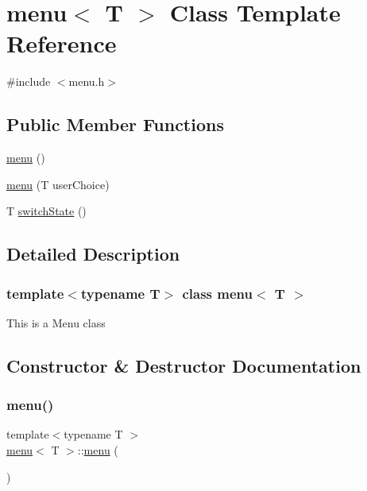 \hypertarget{classmenu}{}\section{menu$<$ T $>$ Class Template Reference}
\label{classmenu}


{\ttfamily \#include $<$menu.\+h$>$}

\subsection*{Public Member Functions}
\begin{DoxyCompactItemize}
\item 
\hyperlink{classmenu_af1685203f74243e56f880ae06443b12a}{menu} ()
\item 
\hyperlink{classmenu_a1ba608803dbd7d3eb5d5f0c7dd58a9f3}{menu} (T user\+Choice)
\item 
T \hyperlink{classmenu_a5ee13e54600aaa2a1202264a2992a493}{switch\+State} ()
\end{DoxyCompactItemize}


\subsection{Detailed Description}
\subsubsection*{template$<$typename T$>$\newline
class menu$<$ T $>$}

This is a Menu class 

\subsection{Constructor \& Destructor Documentation}
\mbox{\label{classmenu_af1685203f74243e56f880ae06443b12a}} 
\subsubsection{\texorpdfstring{menu()}{menu()}\hspace{0.1cm}{\footnotesize\ttfamily [1/2]}}
{\footnotesize\ttfamily template$<$typename T $>$ \\
\hyperlink{classmenu}{menu}$<$ T $>$\+::\hyperlink{classmenu}{menu} (\begin{DoxyParamCaption}{ }\end{DoxyParamCaption})}

